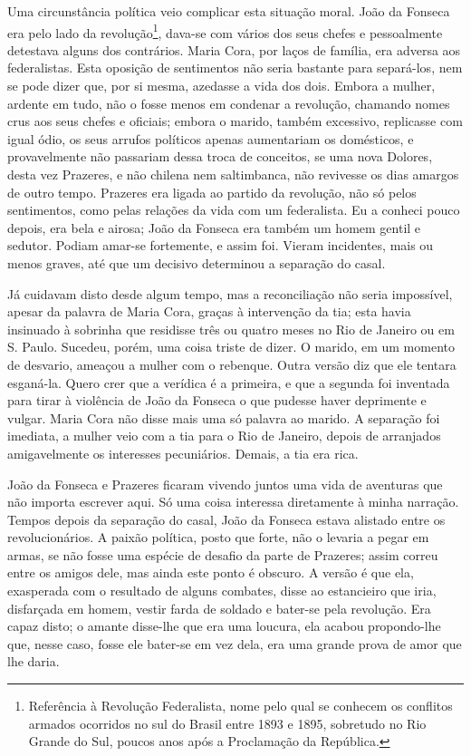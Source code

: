 Uma circunstância política veio complicar esta situação moral. João da
Fonseca era pelo lado da revolução\footnote{Referência à Revolução
  Federalista, nome pelo qual se conhecem os conflitos armados ocorridos
  no sul do Brasil entre 1893 e 1895, sobretudo no Rio Grande do Sul,
  poucos anos após a Proclamação da República.}, dava-se com vários dos
seus chefes e pessoalmente detestava alguns dos contrários. Maria Cora,
por laços de família, era adversa aos federalistas. Esta oposição de
sentimentos não seria bastante para separá-los, nem se pode dizer que,
por si mesma, azedasse a vida dos dois. Embora a mulher, ardente em
tudo, não o fosse menos em condenar a revolução, chamando nomes crus aos
seus chefes e oficiais; embora o marido, também excessivo, replicasse
com igual ódio, os seus arrufos políticos apenas aumentariam os
domésticos, e provavelmente não passariam dessa troca de conceitos, se
uma nova Dolores, desta vez Prazeres, e não chilena nem saltimbanca, não
revivesse os dias amargos de outro tempo. Prazeres era ligada ao partido
da revolução, não só pelos sentimentos, como pelas relações da vida com
um federalista. Eu a conheci pouco depois, era bela e airosa; João da
Fonseca era também um homem gentil e sedutor. Podiam amar-se fortemente,
e assim foi. Vieram incidentes, mais ou menos graves, até que um
decisivo determinou a separação do casal.

Já cuidavam disto desde algum tempo, mas a reconciliação não seria
impossível, apesar da palavra de Maria Cora, graças à intervenção da
tia; esta havia insinuado à sobrinha que residisse três ou quatro meses
no Rio de Janeiro ou em S. Paulo. Sucedeu, porém, uma coisa triste de
dizer. O marido, em um momento de desvario, ameaçou a mulher com o
rebenque. Outra versão diz que ele tentara esganá-la. Quero crer que a
verídica é a primeira, e que a segunda foi inventada para tirar à
violência de João da Fonseca o que pudesse haver deprimente e vulgar.
Maria Cora não disse mais uma só palavra ao marido. A separação foi
imediata, a mulher veio com a tia para o Rio de Janeiro, depois de
arranjados amigavelmente os interesses pecuniários. Demais, a tia era
rica.

João da Fonseca e Prazeres ficaram vivendo juntos uma vida de aventuras
que não importa escrever aqui. Só uma coisa interessa diretamente à
minha narração. Tempos depois da separação do casal, João da Fonseca
estava alistado entre os revolucionários. A paixão política, posto que
forte, não o levaria a pegar em armas, se não fosse uma espécie de
desafio da parte de Prazeres; assim correu entre os amigos dele, mas
ainda este ponto é obscuro. A versão é que ela, exasperada com o
resultado de alguns combates, disse ao estancieiro que iria, disfarçada
em homem, vestir farda de soldado e bater-se pela revolução. Era capaz
disto; o amante disse-lhe que era uma loucura, ela acabou propondo-lhe
que, nesse caso, fosse ele bater-se em vez dela, era uma grande prova de
amor que lhe daria.

